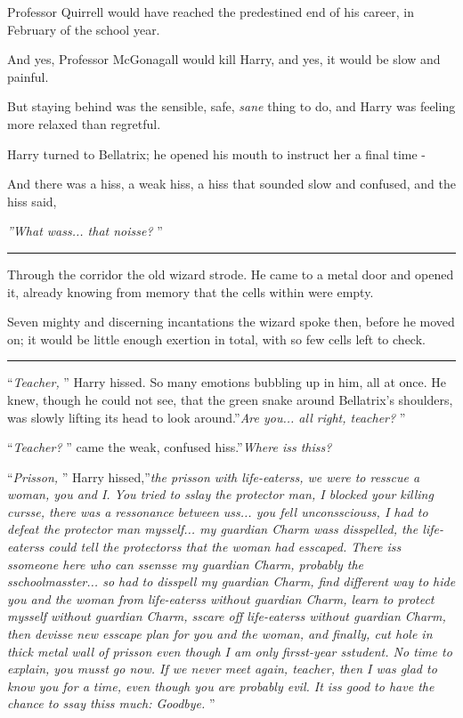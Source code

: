 Professor Quirrell would have reached the predestined end of his career,
in February of the school year.

And yes, Professor McGonagall would kill Harry, and yes, it would be
slow and painful.

But staying behind was the sensible, safe, \emph{sane} thing to do, and
Harry was feeling more relaxed than regretful.

Harry turned to Bellatrix; he opened his mouth to instruct her a final
time -

And there was a hiss, a weak hiss, a hiss that sounded slow and
confused, and the hiss said,

\emph{''What wass... that noisse?} ''

\begin{center}\rule{3in}{0.4pt}\end{center}

Through the corridor the old wizard strode. He came to a metal door and
opened it, already knowing from memory that the cells within were empty.

Seven mighty and discerning incantations the wizard spoke then, before
he moved on; it would be little enough exertion in total, with so few
cells left to check.

\begin{center}\rule{3in}{0.4pt}\end{center}

``\emph{Teacher,} '' Harry hissed. So many emotions bubbling up in him,
all at once. He knew, though he could not see, that the green snake
around Bellatrix's shoulders, was slowly lifting its head to look
around.''\emph{Are you... all right, teacher?} ''

``\emph{Teacher?} '' came the weak, confused hiss.''\emph{Where iss
thiss?}

``\emph{Prisson,} '' Harry hissed,''\emph{the prisson with life-eaterss,
we were to resscue a woman, you and I. You tried to sslay the protector
man, I blocked your killing cursse, there was a ressonance between
uss... you fell unconssciouss, I had to defeat the protector man
mysself... my guardian Charm wass disspelled, the life-eaterss
could tell the protectorss that the woman had esscaped. There iss
ssomeone here who can ssensse my guardian Charm, probably the
sschoolmasster... so had to disspell my guardian Charm, find
different way to hide you and the woman from life-eaterss without
guardian Charm, learn to protect mysself without guardian Charm, sscare
off life-eaterss without guardian Charm, then devisse new esscape plan
for you and the woman, and finally, cut hole in thick metal wall of
prisson even though I am only firsst-year sstudent. No time to explain,
you musst go now. If we never meet again, teacher, then I was glad to
know you for a time, even though you are probably evil. It iss good to
have the chance to ssay thiss much: Goodbye.} ''

